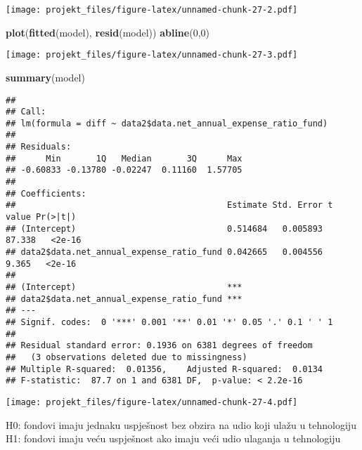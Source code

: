 \documentclass[
]{article}
\newenvironment{Shaded}{\begin{snugshade}}{\end{snugshade}}
\newcommand{\DecValTok}[1]{\textcolor[rgb]{0.00,0.00,0.81}{#1}}
\newcommand{\KeywordTok}[1]{\textcolor[rgb]{0.13,0.29,0.53}{\textbf{#1}}}
\newcommand{\NormalTok}[1]{#1}
\newcommand{\OperatorTok}[1]{\textcolor[rgb]{0.81,0.36,0.00}{\textbf{#1}}}
\begin{document}
\texttt{[image: projekt\_files/figure-latex/unnamed-chunk-27-2.pdf]}

\begin{Shaded}
\begin{Highlighting}[]
\KeywordTok{plot}\NormalTok{(}\KeywordTok{fitted}\NormalTok{(model), }\KeywordTok{resid}\NormalTok{(model))}
\KeywordTok{abline}\NormalTok{(}\DecValTok{0}\NormalTok{,}\DecValTok{0}\NormalTok{)}
\end{Highlighting}
\end{Shaded}

\texttt{[image: projekt\_files/figure-latex/unnamed-chunk-27-3.pdf]}

\begin{Shaded}
\begin{Highlighting}[]
\KeywordTok{summary}\NormalTok{(model)}
\end{Highlighting}
\end{Shaded}

\begin{verbatim}
## 
## Call:
## lm(formula = diff ~ data2$data.net_annual_expense_ratio_fund)
## 
## Residuals:
##      Min       1Q   Median       3Q      Max 
## -0.60833 -0.13780 -0.02247  0.11160  1.57705 
## 
## Coefficients:
##                                          Estimate Std. Error t value Pr(>|t|)
## (Intercept)                              0.514684   0.005893  87.338   <2e-16
## data2$data.net_annual_expense_ratio_fund 0.042665   0.004556   9.365   <2e-16
##                                             
## (Intercept)                              ***
## data2$data.net_annual_expense_ratio_fund ***
## ---
## Signif. codes:  0 '***' 0.001 '**' 0.01 '*' 0.05 '.' 0.1 ' ' 1
## 
## Residual standard error: 0.1936 on 6381 degrees of freedom
##   (3 observations deleted due to missingness)
## Multiple R-squared:  0.01356,    Adjusted R-squared:  0.0134 
## F-statistic:  87.7 on 1 and 6381 DF,  p-value: < 2.2e-16
\end{verbatim}

\begin{Shaded}
\end{Shaded}

\texttt{[image: projekt\_files/figure-latex/unnamed-chunk-27-4.pdf]}

H0: fondovi imaju jednaku uspješnost bez obzira na udio koji ulažu u
tehnologiju H1: fondovi imaju veću uspješnost ako imaju veći udio
ulaganja u tehnologiju
\end{document}
